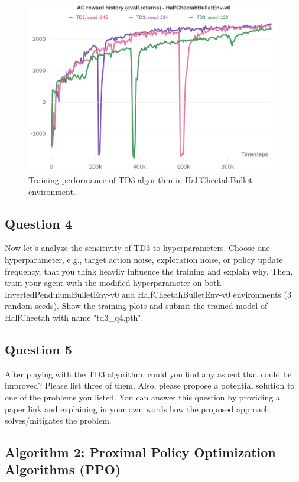 \documentclass[12pt]{article}
\begin{document}
\begin{figure}[phb] 
	\centering  %
    \includegraphics[width=0.65\columnwidth]{img/Figure_2_WB_HalfCheetahBullet_TD3.png}
	\caption{Training performance of TD3 algorithm in HalfCheetahBullet environment.}
	\label{fig:fig2}
\end{figure}

\pagebreak

\subsection*{Question 4}

Now let’s analyze the sensitivity of TD3 to hyperparameters. Choose one hyperparameter, e.g.,
target action noise, exploration noise, or policy update frequency, that you think heavily influence the training and explain why. Then, train your agent with the modified hyperparameter on both InvertedPendulumBulletEnv-v0 and HalfCheetahBulletEnv-v0 environments (3 random seeds).
Show the training plots and submit the trained model of HalfCheetah with name "td3\_q4.pth".

\subsection*{Question 5}

After playing with the TD3 algorithm, could you find any aspect that could be improved? Please
list three of them. Also, please propose a potential solution to one of the problems you listed.
You can answer this question by providing a paper link and explaining in your own words how
the proposed approach solves/mitigates the problem.

\pagebreak

\subsection*{Algorithm 2: Proximal Policy Optimization Algorithms (PPO)}
\end{document}
